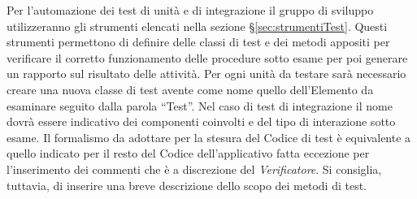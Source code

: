   Per l’automazione dei test di unità e di integrazione il gruppo di sviluppo utilizzeranno gli strumenti elencati nella sezione \S\ref{sec:strumentiTest}. Questi strumenti permettono di definire delle classi di test
  e dei metodi appositi per verificare il corretto funzionamento delle procedure sotto esame per poi generare un rapporto sul risultato delle attività.
  Per ogni unità da testare sarà necessario creare una nuova classe di test avente come nome quello dell’Elemento da esaminare seguito dalla parola “Test”. Nel caso di test di integrazione il nome dovrà essere indicativo dei componenti coinvolti e del tipo di interazione sotto esame. Il formalismo da adottare per la stesura del Codice di test è equivalente a quello indicato per il resto del Codice dell’applicativo fatta eccezione per l’inserimento dei commenti che è a discrezione del \emph{Verificatore}. Si consiglia, tuttavia, di inserire una breve descrizione dello scopo dei metodi di test.
  
